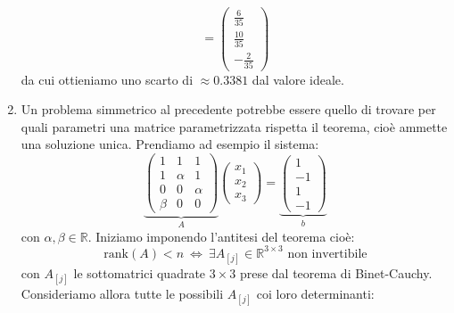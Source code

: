 \documentclass[a4paper,11pt]{article}
\begin{document}
\begin{enumerate}
$$=
\begin{pmatrix}
	\frac{6}{35} \\ 
	\frac{10}{35} \\
	-\frac{2}{35}
\end{pmatrix}
$$
da cui ottieniamo uno scarto di $\approx 0.3381$ dal valore ideale.
\item Un problema simmetrico al precedente potrebbe essere quello di trovare per quali parametri una matrice parametrizzata rispetta il teorema, cioè ammette una soluzione unica.
	Prendiamo ad esempio il sistema:
$$
\underbrace{
\begin{pmatrix}
	1 & 1 & 1 \\ 
	1 & \alpha & 1 \\
	0 & 0 & \alpha \\ 
	\beta & 0 & 0
\end{pmatrix}
}_A
\begin{pmatrix}
	x_1 \\ 
	x_2 \\
	x_3
\end{pmatrix}
=
\underbrace{
\begin{pmatrix}
	1 \\ 
	-1 \\
	1 \\
	-1
\end{pmatrix}
}_b
$$
con $\alpha, \beta \in \mathbb{R}$.
Iniziamo imponendo l'antitesi del teorema cioè:
$$
\mathrm{rank}(A) < n \ \Leftrightarrow \ \exists A_{[j]} \in \mathbb{R}^{3 \times 3} \text{ non invertibile}
$$
con $A_{[j]}$ le sottomatrici quadrate $3 \times 3$ prese dal teorema di Binet-Cauchy.
Consideriamo allora tutte le possibili $A_{[j]}$ coi loro determinanti:


\end{enumerate}
\end{document}
